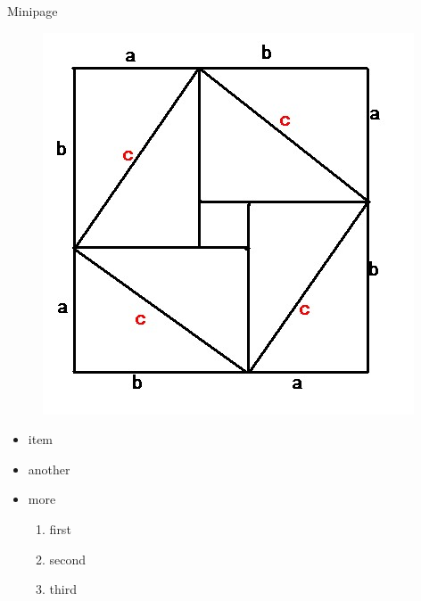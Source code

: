     \begin{frame}{Minipage}
        \begin{minipage}{0.5\linewidth}
            \begin{figure}[h]
                \includegraphics[width=\textwidth]{imgs/pythagorean.jpg}
            \end{figure}
        \end{minipage}%
        \hfill
        \begin{minipage}{0.4\linewidth}
            \begin{itemize}
                \item item
                \item another
                \item more
                \begin{enumerate}
                    \item first
                    \item second
                    \item third
                \end{enumerate}
            \end{itemize}
        \end{minipage}
        
    \end{frame}


